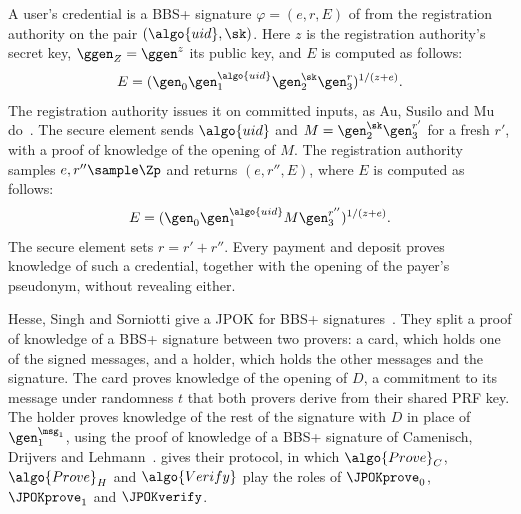 A user's credential is a BBS+ signature $\varphi = (e, r, E)$ of
 from the registration authority on the pair $(\algo{uid},
\sk)$. Here $z$ is the registration authority's secret key, $\ggen_Z =
\ggen^{z}$ its public key, and $E$ is computed as follows:
%
\begin{equation*}
  E = (\gen_0 \gen_1^{\algo{uid}} \gen_2^{\sk} \gen_3^{r})^{1/(z+e)}.
\end{equation*}
%
The registration authority issues it on committed inputs, as Au, Susilo and Mu
do~\cite{SCN:AuSusMu06}. The secure element sends $\algo{uid}$ and $M =
\gen_2^{\sk} \gen_3^{r'}$ for a fresh $r'$, with a proof of knowledge of the
opening of $M$. The registration authority samples $e, r'' \sample \Zp$ and
returns $(e, r'', E)$, where $E$ is computed as follows:
%
\begin{equation*}
  E = (\gen_0 \gen_1^{\algo{uid}} M \gen_3^{r''})^{1/(z+e)}.
\end{equation*}
%
The secure element sets $r = r' + r''$.
Every payment and deposit proves knowledge of such a credential, together with
the opening of the payer's pseudonym, without revealing either.

Hesse, Singh and Sorniotti give a JPOK for BBS+
signatures~\cite{USENIX:HesSinSor23}. They split a proof
of knowledge of a BBS+ signature between two provers: a card, which holds one of the signed messages, and a
holder, which holds the other messages and the signature. The card proves
knowledge of the opening of $D$, a commitment to its message under randomness
$t$ that both provers derive from their shared PRF key. The holder proves
knowledge of the rest of the signature with $D$ in place of $\gen_1^{\msg_1}$,
using the proof of knowledge of a BBS+ signature of Camenisch, Drijvers and
Lehmann~\cite{CDL16}.  gives their protocol, in
which $\algo{Prove}_C$, $\algo{Prove}_H$ and $\algo{Verify}$ play the roles of
$\JPOKprove_0$, $\JPOKprove_1$ and $\JPOKverify$.

